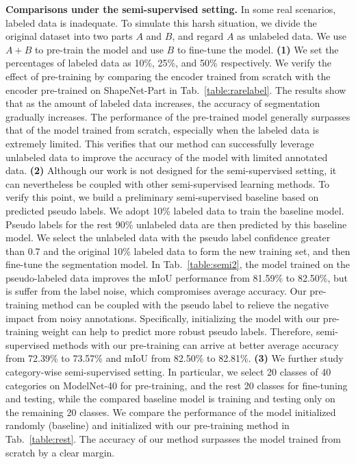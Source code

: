\documentclass[journal]{IEEEtran}
\begin{document}
\textbf{Comparisons under the semi-supervised setting.} In some real scenarios, labeled data is inadequate. To simulate this harsh situation, we divide the original dataset into two parts $A$ and $B$, and regard $A$ as unlabeled data. 
We use $A+B$ to pre-train the model and use $B$ to fine-tune the model.
\textbf{(1)} We set the percentages of labeled data as 10\%, 25\%, and 50\% respectively. We verify the effect of pre-training by comparing the encoder trained from scratch with the encoder pre-trained on ShapeNet-Part in Tab.~\ref{table:rarelabel}. 
The results show that as the amount of labeled data increases, the accuracy of segmentation gradually increases. The performance of the pre-trained model generally surpasses that of the model trained from scratch, especially when the labeled data is extremely limited. This verifies that our method can successfully leverage unlabeled data to improve the accuracy of the model with limited annotated data. 
\textbf{(2)} Although our work is not designed for the semi-supervised setting, it can nevertheless be coupled with other semi-supervised learning methods. To verify this point, we build a preliminary semi-supervised baseline based on predicted pseudo labels. We adopt 10\% labeled data to train the baseline model. Pseudo labels for the rest 90\% unlabeled data are then predicted by this baseline model.  
We select the unlabeled data with the pseudo label confidence greater than 0.7 and the original 10\% labeled data to form the new training set, and then fine-tune the segmentation model. 
In Tab.~\ref{table:semi2}, the model trained on the pseudo-labeled data improves the mIoU performance from 81.59\% to 82.50\%, but is suffer from the label noise, which compromises average accuracy. Our pre-training method can be coupled with the pseudo label to relieve the negative impact from noisy annotations. 
Specifically, initializing the model with our pre-training weight can help to predict more robust pseudo labels. Therefore, semi-supervised methods with our pre-training can arrive at better average accuracy from 72.39\% to 73.57\% and mIoU from 82.50\% to 82.81\%.
\textbf{(3)} We further study category-wise semi-supervised setting. In particular, we select 20 classes of 40 categories on ModelNet-40 for pre-training, and the rest 20 classes for fine-tuning and testing, while the compared baseline model is training and testing only on the remaining 20 classes. We compare the performance of the model initialized randomly (baseline) and initialized with our pre-training method in Tab.~\ref{table:rest}. The accuracy of our method surpasses the model trained from scratch by a clear margin.
\end{document}
